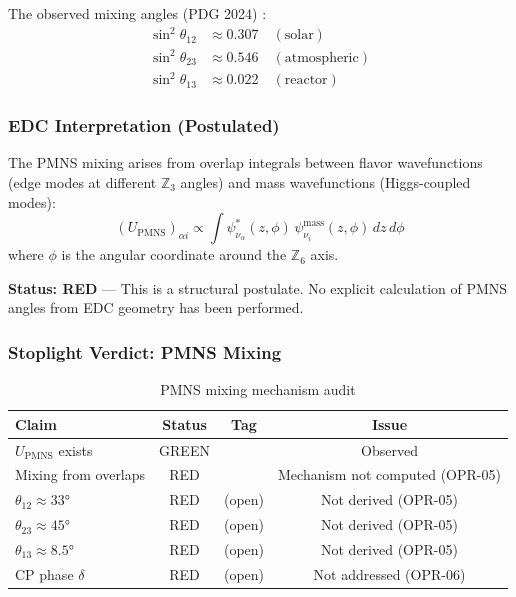 The observed mixing angles (PDG 2024) \tagBL{}:
\begin{align}
    \sin^2\theta_{12} &\approx 0.307 \quad (\text{solar}) \\
    \sin^2\theta_{23} &\approx 0.546 \quad (\text{atmospheric}) \\
    \sin^2\theta_{13} &\approx 0.022 \quad (\text{reactor})
\end{align}

\subsubsection{EDC Interpretation (Postulated)}

\begin{postulate}
\label{post:ch6_pmns}
The PMNS mixing arises from overlap integrals between flavor wavefunctions
(edge modes at different $\mathbb{Z}_3$ angles) and mass wavefunctions
(Higgs-coupled modes):
\begin{equation}
    (U_{\text{PMNS}})_{\alpha i} \propto \int \psi^*_{\nu_\alpha}(z, \phi) \,
    \psi_{\nu_i}^{\text{mass}}(z, \phi) \, dz \, d\phi
    \label{eq:ch6_pmns_overlap}
\end{equation}
where $\phi$ is the angular coordinate around the $\mathbb{Z}_6$ axis.
\end{postulate}

\textbf{Status: RED} \tagP{} --- This is a structural postulate. No explicit
calculation of PMNS angles from EDC geometry has been performed.

\subsubsection{Stoplight Verdict: PMNS Mixing}

\begin{table}[ht]
\centering
\caption{PMNS mixing mechanism audit}
\label{tab:ch6_pmns_stoplight}
\begin{tabular}{lccc}
\toprule
\textbf{Claim} & \textbf{Status} & \textbf{Tag} & \textbf{Issue} \\
\midrule
$U_{\text{PMNS}}$ exists & GREEN & \tagBL{} & Observed \\
Mixing from overlaps & RED & \tagP{} & Mechanism not computed (OPR-05) \\
$\theta_{12} \approx 33°$ & RED & (open) & Not derived (OPR-05) \\
$\theta_{23} \approx 45°$ & RED & (open) & Not derived (OPR-05) \\
$\theta_{13} \approx 8.5°$ & RED & (open) & Not derived (OPR-05) \\
CP phase $\delta$ & RED & (open) & Not addressed (OPR-06) \\
\bottomrule
\end{tabular}
\end{table}

